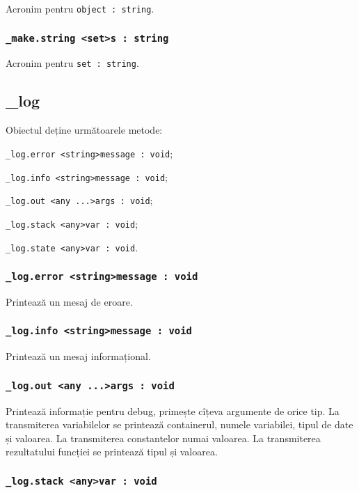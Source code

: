 Acronim pentru \lstinline|object : string|.

\subsubsection{\lstinline|_make.string <set>s : string|}

Acronim pentru \lstinline|set : string|.

\subsection{{\color{orange} \_log}}

Obiectul \logtype{} deține următoarele metode:
\begin{icItems}
	\item \lstinline|_log.error <string>message : void|;
	\item \lstinline|_log.info <string>message : void|;
	\item \lstinline|_log.out <any ...>args : void|;
	\item \lstinline|_log.stack <any>var : void|;
	\item \lstinline|_log.state <any>var : void|.
\end{icItems}

\subsubsection{\lstinline|_log.error <string>message : void|}

Printează un mesaj de eroare.

\subsubsection{\lstinline|_log.info <string>message : void|}

Printează un mesaj informațional.

\subsubsection{\lstinline|_log.out <any ...>args : void|}

Printează informație pentru debug, primește cîțeva argumente de orice tip. La transmiterea variabilelor se printează containerul, numele variabilei, tipul de date și valoarea. La transmiterea constantelor numai valoarea. La transmiterea rezultatului funcției se printează tipul și valoarea.

\subsubsection{\lstinline|_log.stack <any>var : void|}

